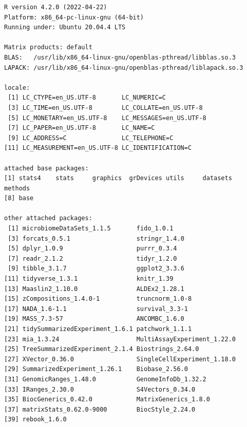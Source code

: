 \documentclass[
]{book}
\begin{document}
\begin{verbatim}
R version 4.2.0 (2022-04-22)
Platform: x86_64-pc-linux-gnu (64-bit)
Running under: Ubuntu 20.04.4 LTS

Matrix products: default
BLAS:   /usr/lib/x86_64-linux-gnu/openblas-pthread/libblas.so.3
LAPACK: /usr/lib/x86_64-linux-gnu/openblas-pthread/liblapack.so.3

locale:
 [1] LC_CTYPE=en_US.UTF-8       LC_NUMERIC=C              
 [3] LC_TIME=en_US.UTF-8        LC_COLLATE=en_US.UTF-8    
 [5] LC_MONETARY=en_US.UTF-8    LC_MESSAGES=en_US.UTF-8   
 [7] LC_PAPER=en_US.UTF-8       LC_NAME=C                 
 [9] LC_ADDRESS=C               LC_TELEPHONE=C            
[11] LC_MEASUREMENT=en_US.UTF-8 LC_IDENTIFICATION=C       

attached base packages:
[1] stats4    stats     graphics  grDevices utils     datasets  methods  
[8] base     

other attached packages:
 [1] microbiomeDataSets_1.1.5       fido_1.0.1                    
 [3] forcats_0.5.1                  stringr_1.4.0                 
 [5] dplyr_1.0.9                    purrr_0.3.4                   
 [7] readr_2.1.2                    tidyr_1.2.0                   
 [9] tibble_3.1.7                   ggplot2_3.3.6                 
[11] tidyverse_1.3.1                knitr_1.39                    
[13] Maaslin2_1.10.0                ALDEx2_1.28.1                 
[15] zCompositions_1.4.0-1          truncnorm_1.0-8               
[17] NADA_1.6-1.1                   survival_3.3-1                
[19] MASS_7.3-57                    ANCOMBC_1.6.0                 
[21] tidySummarizedExperiment_1.6.1 patchwork_1.1.1               
[23] mia_1.3.24                     MultiAssayExperiment_1.22.0   
[25] TreeSummarizedExperiment_2.1.4 Biostrings_2.64.0             
[27] XVector_0.36.0                 SingleCellExperiment_1.18.0   
[29] SummarizedExperiment_1.26.1    Biobase_2.56.0                
[31] GenomicRanges_1.48.0           GenomeInfoDb_1.32.2           
[33] IRanges_2.30.0                 S4Vectors_0.34.0              
[35] BiocGenerics_0.42.0            MatrixGenerics_1.8.0          
[37] matrixStats_0.62.0-9000        BiocStyle_2.24.0              
[39] rebook_1.6.0                  


\end{verbatim}
\end{document}

